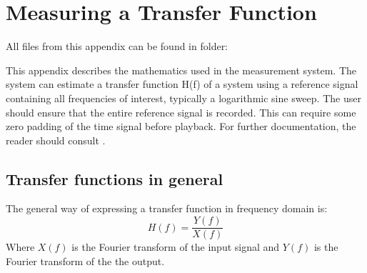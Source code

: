 \section{Measuring a Transfer Function}\label{Sec:MeasATransFunc}

All files from this appendix can be found in folder: \\

This appendix describes the mathematics used in the measurement system. The system can estimate a transfer function H(f) of a system using a reference signal containing all frequencies of interest, typically  a logarithmic sine sweep. The user should ensure that the entire reference signal is recorded. This can require some zero padding of the time signal before playback. For further documentation, the reader should consult \cite{TutorialMeasurementPowerSpectra}.
\subsection{Transfer functions in general}
The general way of expressing a transfer function in frequency domain is:
\begin{equation}
H(f)=\frac{Y(f)}{X(f)}
\label{Eq:TranferFunction}
\end{equation}
Where $X(f)$ is the Fourier transform of the input signal and $Y(f)$ is the Fourier transform of the the output.  

